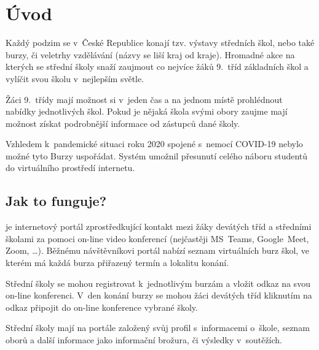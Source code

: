 \chapter*{Úvod}

Každý podzim se v~České Republice konají tzv. výstavy středních škol, nebo také burzy, či veletrhy vzdělávání (názvy se liší kraj od kraje).
  Hromadné akce na kterých se střední školy snaží zaujmout co nejvíce žáků 9.~tříd základních škol a vylíčit svou školu v~nejlepším světle.

Žáci 9.~třídy mají možnost si v~jeden čas a na jednom místě prohlédnout nabídky jednotlivých škol.
Pokud je nějaká škola svými obory zaujme mají možnost získat podrobnější informace od zástupců dané školy. 

Vzhledem k~pandemické situaci roku 2020 spojené s~nemocí COVID\hbox{-}19 nebylo možné tyto Burzy uspořádat. Systém \bso{} umožnil přesunutí celého náboru studentů do virtuálního prostředí internetu.

\section*{Jak to funguje?}
\bso{} je internetový portál zprostředkující kontakt mezi žáky devátých tříd a středními školami za pomoci on-line video konferencí (nejčastěji MS~Teams\cite{ms-teams}, Google~Meet\cite{google-meet}, Zoom\cite{zoom}, \ldots). 
Běžnému návštěvníkovi portál nabízí seznam virtuálních burz škol, ve kterém má každá burza přiřazený termín a lokalitu konání.

Střední školy se mohou registrovat k~jednotlivým burzám a vložit odkaz na svou on-line konferenci. V~den konání burzy se mohou žáci devátých tříd kliknutím na odkaz připojit do on-line konference vybrané školy.

Střední školy mají na portále založený svůj profil s~informacemi o~škole, seznam oborů a další informace jako informační brožura, či výsledky v~soutěžích.

\pagebreak

